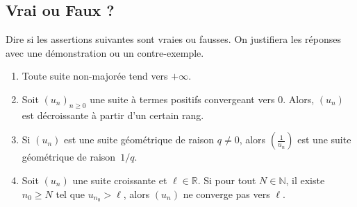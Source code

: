 \subsection{Vrai ou Faux ?}
Dire si les assertions suivantes sont vraies ou fausses. On justifiera les réponses avec une démonstration ou un contre-exemple.
\begin{enumerate}[label = $\square$, itemsep = 0.5em]
  \item Toute suite non-majorée tend vers $+\infty$.

  \item Soit $\left(u_n\right)_{n \geq 0}$ une suite à termes positifs convergeant vers $0$. Alors, $(u_n)$ est décroissante à partir d'un certain rang.

  \item Si $(u_n)$ est une suite géométrique de raison $q \neq 0$, alors $\left(\frac{1}{u_n}\right)$ est une suite géométrique de raison~$1/q$.

  \item Soit $(u_n)$ une suite croissante et $\ell \in \mathbb{R}$. Si pour tout $N \in \mathbb{N}$, il existe $n_0 \geq N$ tel que $u_{n_0} > \ell$, alors $(u_n)$ ne converge pas vers $\ell$.


\end{enumerate}
